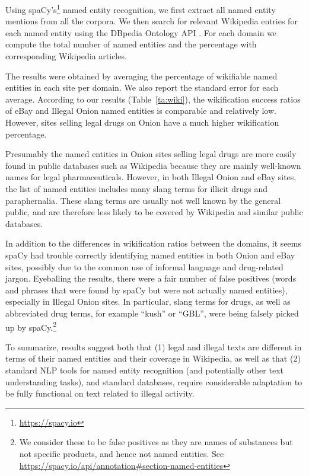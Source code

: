 \documentclass[11pt,a4paper,table]{article}
\begin{document}
    Using spaCy's\footnote{\url{https://spacy.io}}
    named entity recognition, we first extract all named
    entity mentions from all the corpora. 
    We then search for relevant Wikipedia entries for each named entity using the DBpedia Ontology API \cite{isem2013daiber}.
    For each domain we compute the total number of named entities and the percentage with corresponding Wikipedia articles.

    The results were obtained by averaging the percentage of wikifiable named entities in each site per domain. We also report the standard error for each average.
    According to our results (Table~\ref{ta:wiki}), the wikification success ratios of eBay and Illegal Onion named entities is comparable and relatively low. However, sites selling legal drugs on Onion have a much higher wikification percentage.

Presumably the named entities in Onion sites selling legal drugs are
more easily found in public databases such as Wikipedia because they
are mainly well-known names for legal pharmaceuticals. However, in
both Illegal Onion and eBay sites, the list of named entities includes
many slang terms for illicit drugs and paraphernalia. These slang terms
are usually not well known by the general public, and are therefore
less likely to be covered by Wikipedia and similar public databases.


In addition to the differences in wikification ratios between
the domains, it seems spaCy had trouble correctly identifying
named entities in both Onion and eBay sites, possibly
due to the common use of informal language and drug-related jargon.
Eyeballing the results, there were a fair number of false positives (words and phrases that were found by spaCy but were not actually named entities),
especially in Illegal Onion sites.
In particular, slang terms for drugs, as well as abbreviated drug terms, for example ``kush'' or ``GBL'',
were being falsely picked up by spaCy.\footnote{We
consider these to be false positives as they are names of substances but not specific products, 
and hence not named entities. See \url{https://spacy.io/api/annotation\#section-named-entities}}

To summarize, results suggest both that (1) legal and illegal texts are different in terms of their named entities and their coverage in Wikipedia, as well as that (2) standard NLP tools for named entity recognition (and potentially other text understanding tasks), and standard databases, require considerable adaptation to be fully functional on text related to illegal activity.
\end{document}
